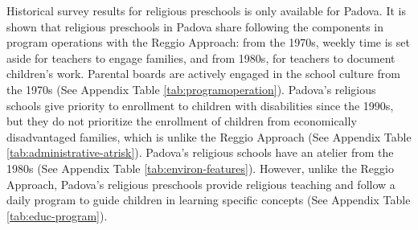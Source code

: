 Historical survey results for religious preschools is only available for Padova. It is shown that religious preschools in Padova share following the components in program operations with the Reggio Approach: from the 1970s, weekly time is set aside for teachers to engage families, and from 1980s, for teachers to document children's work. Parental boards are actively engaged in the school culture from the 1970s (See Appendix Table \ref{tab:programoperation}). Padova's religious schools give priority to enrollment to children with disabilities since the 1990s, but they do not prioritize the enrollment of children from economically disadvantaged families, which is unlike the Reggio Approach (See Appendix Table \ref{tab:administrative-atrisk}). Padova's religious schools have an atelier from the 1980s (See Appendix Table \ref{tab:environ-features}). However, unlike the Reggio Approach, Padova's religious preschools provide religious teaching and follow a daily program to guide children in learning specific concepts (See Appendix Table \ref{tab:educ-program}).

